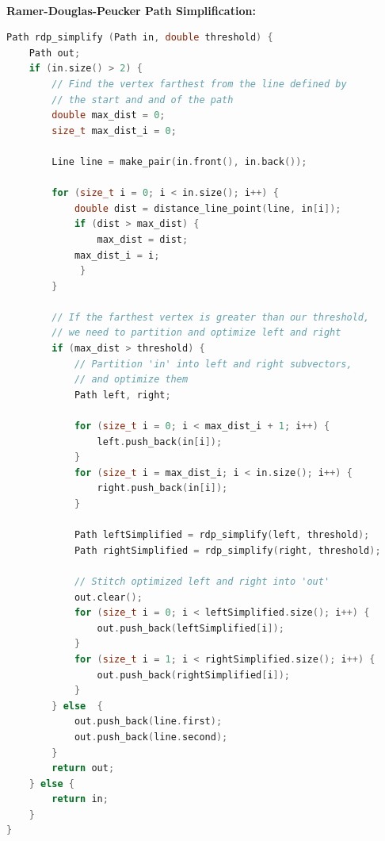 \documentclass[titlepage,12pt,a4paper]{article}
\begin{document}
\textbf{\\Ramer-Douglas-Peucker Path Simplification: \\}
\begin{lstlisting}[language=C++]
Path rdp_simplify (Path in, double threshold) {
    Path out;
    if (in.size() > 2) {
        // Find the vertex farthest from the line defined by 
        // the start and and of the path
        double max_dist = 0;
        size_t max_dist_i = 0;

        Line line = make_pair(in.front(), in.back());

        for (size_t i = 0; i < in.size(); i++) {
            double dist = distance_line_point(line, in[i]);
            if (dist > max_dist) {
                max_dist = dist;
	        max_dist_i = i;
             }
        }

        // If the farthest vertex is greater than our threshold,
        // we need to partition and optimize left and right
        if (max_dist > threshold) {
            // Partition 'in' into left and right subvectors,
            // and optimize them
            Path left, right;

            for (size_t i = 0; i < max_dist_i + 1; i++) {
                left.push_back(in[i]);
            }
            for (size_t i = max_dist_i; i < in.size(); i++) {
                right.push_back(in[i]);
            }

            Path leftSimplified = rdp_simplify(left, threshold);
            Path rightSimplified = rdp_simplify(right, threshold);

            // Stitch optimized left and right into 'out'
            out.clear();
            for (size_t i = 0; i < leftSimplified.size(); i++) {
                out.push_back(leftSimplified[i]);
            }
            for (size_t i = 1; i < rightSimplified.size(); i++) {
                out.push_back(rightSimplified[i]);
            }
        } else  {
            out.push_back(line.first);
            out.push_back(line.second);
        }
        return out;
    } else {
        return in;
    }
}
	
\end{lstlisting}
\end{document}
